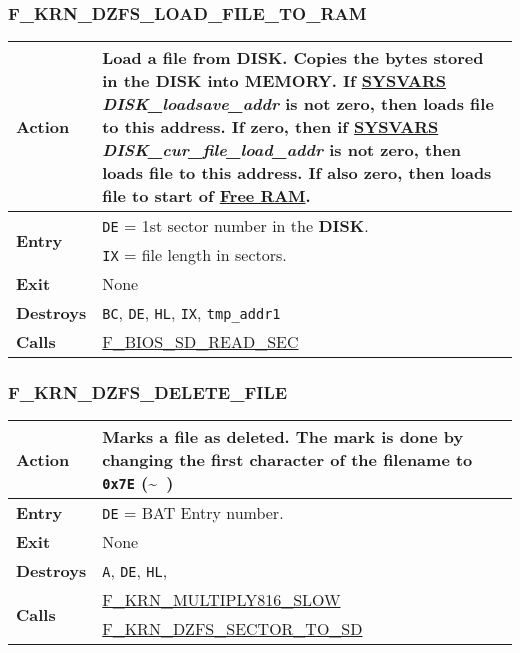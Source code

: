    \subsubsection{F\_KRN\_DZFS\_LOAD\_FILE\_TO\_RAM}
    \label{func:fkrndzfsloadfiletoram}
    \begin{tabular}{l p{15cm}}
        \hline\textbf{Action}
        & Load a file from \textbf{DISK}. Copies the bytes stored in the
        \textbf{DISK} into \textbf{MEMORY}. If \hyperref[sec:ram_memmap]{SYSVARS}
        \textit{DISK\_loadsave\_addr} is not zero, then loads file to this
        address. If zero, then if \hyperref[sec:ram_memmap]{SYSVARS}
        \textit{DISK\_cur\_file\_load\_addr} is not zero, then loads file to
        this address. If also zero, then loads file to start of
        \hyperref[subsec:memmap:ram]{Free RAM}.\\
        \hline\multirow[t]{2}{4em}{\textbf{Entry}}
        & \texttt{DE} = 1st sector number in the \textbf{DISK}.\\
        & \texttt{IX} = file length in sectors.\\
        \hline\textbf{Exit} & None\\
        \hline\textbf{Destroys} & \texttt{BC}, \texttt{DE}, \texttt{HL},
        \texttt{IX}, \texttt{tmp\_addr1}\\
        \hline\textbf{Calls}
        & \hyperref[func:fbiosdiskreadsec]{F\_BIOS\_SD\_READ\_SEC}\\
        \hline
    \end{tabular}

    \subsubsection{F\_KRN\_DZFS\_DELETE\_FILE}
    \label{func:fkrndzfsdeletefile}
    \begin{tabular}{l p{15cm}}
        \hline\textbf{Action}
        & Marks a file as deleted. The mark is done by changing the first
        character of the filename to \texttt{0x7E} (\textasciitilde~)\\
        \hline\textbf{Entry}
        & \texttt{DE} = BAT Entry number.\\
        \hline\textbf{Exit} & None\\
        \hline\textbf{Destroys} & \texttt{A}, \texttt{DE}, \texttt{HL},\\
        \hline\multirow[t]{2}{4em}{\textbf{Calls}}
        & \hyperref[func:fkrnmultiply816slow]{F\_KRN\_MULTIPLY816\_SLOW}\\
        & \hyperref[func:fkrndzfssectortodisk]{F\_KRN\_DZFS\_SECTOR\_TO\_SD}\\
        \hline
    \end{tabular}

